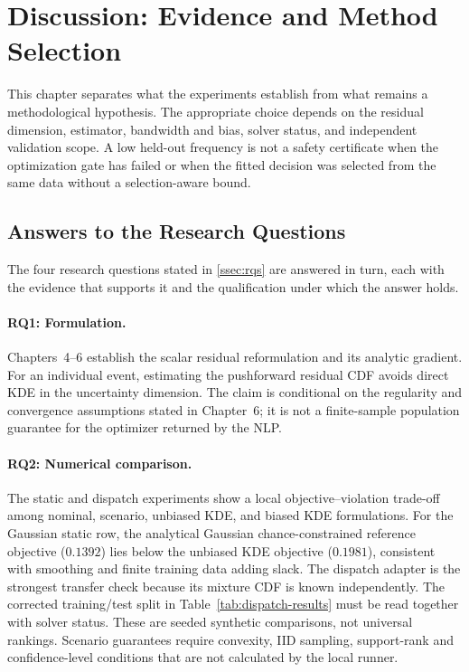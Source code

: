 \section{Discussion: Evidence and Method Selection}
\label{ch:discussion}

This chapter separates what the experiments establish from what remains a
methodological hypothesis. The appropriate choice depends on the residual
dimension, estimator, bandwidth and bias, solver status, and independent
validation scope. A low held-out frequency is not a safety certificate when
the optimization gate has failed or when the fitted decision was selected from
the same data without a selection-aware bound.

\subsection{Answers to the Research Questions}
\label{sec:discussion-rq}

The four research questions stated in \cref{ssec:rqs} are answered in
turn, each with the evidence that supports it and the qualification under
which the answer holds.

\paragraph*{RQ1: Formulation.}
Chapters~4--6 establish the scalar residual reformulation and its analytic
gradient. For an individual event, estimating the pushforward residual CDF
avoids direct KDE in the uncertainty dimension. The claim is conditional on
the regularity and convergence assumptions stated in Chapter~6; it is not a
finite-sample population guarantee for the optimizer returned by the NLP.

\paragraph*{RQ2: Numerical comparison.}
The static and dispatch experiments show a local objective--violation trade-off
among nominal, scenario, unbiased KDE, and biased KDE formulations.
For the Gaussian static row, the analytical Gaussian chance-constrained
reference objective ($0.1392$) lies below the unbiased KDE objective
($0.1981$), consistent with smoothing and finite training data adding slack.
The dispatch adapter is the strongest transfer check because its mixture CDF is
known independently. The corrected training/test split in
Table~\ref{tab:dispatch-results} must be read together with solver status.
These are seeded synthetic comparisons, not universal rankings. Scenario
guarantees require convexity, IID sampling, support-rank and confidence-level
conditions that are not calculated by the local runner.

